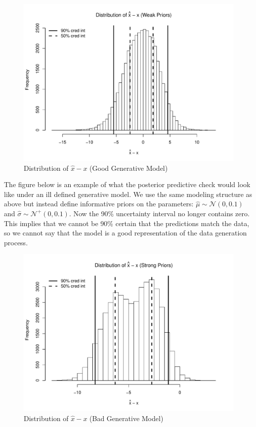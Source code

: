 \documentclass[12pt]{article}
\begin{document}
\begin{figure}[H]\caption[]{Distribution of $\hat{x}-x$ (Good Generative Model)}
\centering
\begin{minipage}{0.6\linewidth}
\includegraphics[trim={0cm 0cm 0cm 1.5cm}, clip, scale=0.5]{../figs/norm1_pp_diff.pdf}
\end{minipage}
\end{figure}

\noindent The figure below is an example of what the posterior predictive check would look like under an ill defined generative model. We use the same modeling structure as above but instead define informative priors on the parameters: $\hat{\mu} \sim \mathcal{N}(0,0.1)$ and $\hat{\sigma} \sim \mathcal{N}^{+}(0,0.1)$. Now the 90\% uncertainty interval no longer contains zero. This implies that we cannot be 90\% certain that the predictions match the data, so we cannot say that the model is a good representation of the data generation process. \\

\begin{figure}[H]\caption[]{Distribution of $\hat{x}-x$ (Bad Generative Model)}
\centering
\begin{minipage}{0.6\linewidth}
\includegraphics[trim={0cm 0cm 0cm 1.5cm}, clip, scale=0.5]{../figs/norm1_pp_diff_bad.pdf}
\end{minipage}
\end{figure}
\end{document}
